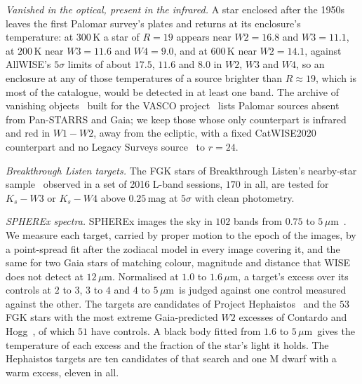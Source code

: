 \documentclass[3p,11pt]{elsarticle}
\newcommand{\um}{\,$\mu$m}
\begin{document}
\emph{Vanished in the optical, present in the infrared.} A star enclosed after the 1950s
leaves the first Palomar survey's plates and returns at its enclosure's temperature: at
$300$\,K a star of $R=19$ appears near $W2=16.8$ and $W3=11.1$, at $200$\,K near
$W3=11.6$ and $W4=9.0$, and at $600$\,K near $W2=14.1$, against AllWISE's $5\sigma$
limits of about $17.5$, $11.6$ and $8.0$ in $W2$, $W3$ and $W4$, so an enclosure at any
of those temperatures of a source brighter than $R\approx19$, which is most of the
catalogue, would be detected in at least one band. The archive of
vanishing objects~\cite{Solano2022} built for the VASCO project~\cite{Villarroel2020}
lists Palomar sources absent from Pan-STARRS and Gaia; we keep those whose only
counterpart is infrared and red in $W1-W2$, away from the ecliptic, with a fixed
CatWISE2020 counterpart and no Legacy Surveys source~\cite{Dey2019} to $r=24$.

\emph{Breakthrough Listen targets.} The FGK stars of Breakthrough Listen's nearby-star
sample~\cite{Isaacson2017} observed in a set of 2016 L-band sessions, $170$ in all, are
tested for $K_s-W3$ or $K_s-W4$ above $0.25$\,mag at $5\sigma$ with clean photometry.

\emph{SPHEREx spectra.} SPHEREx images the sky in $102$ bands from $0.75$ to
$5$\um~\cite{Dore2014}. We measure each target, carried by proper motion to the epoch
of the images, by a point-spread fit after the zodiacal model in every image covering
it, and the same for two Gaia stars of matching colour, magnitude and distance that WISE
does not detect at $12$\um. Normalised at $1.0$ to $1.6$\um, a target's excess over its
controls at $2$ to $3$, $3$ to $4$ and $4$ to $5$\um\ is judged against one control
measured against the other. The targets are candidates of Project
Hephaistos~\cite{Suazo2024} and the $53$ FGK stars with the most extreme Gaia-predicted
$W2$ excesses of Contardo and Hogg~\cite{Contardo2024}, of which $51$ have controls. A black body
fitted from $1.6$ to $5$\um\ gives the temperature of each excess and the fraction of
the star's light it holds. The Hephaistos targets are ten candidates of that search and
one M dwarf with a warm excess, eleven in all.
\end{document}
